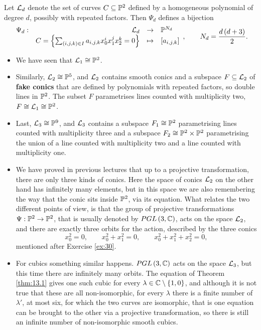 \begin{definition}
Let $ \LL_d $ denote the set of curves $ C \subseteq \P^2 $ defined by a homogeneous polynomial of degree $ d $, possibly with repeated factors. Then $ \Psi_d $ defines a bijection
$$ \function[\Psi_d]{\LL_d}{\P^{N_d}}{C = \cb{\sum_{\rb{i, j, k} \in I} a_{i, j, k}x_0^ix_1^jx_2^k = 0}}{\sb{a_{i, j, k}}}, \qquad N_d = \dfrac{d\rb{d + 3}}{2}. $$
\end{definition}

\begin{example}
\hfill
\begin{itemize}
\item We have seen that $ \LL_1 \cong \P^2 $.
\item Similarly, $ \LL_2 \cong \P^5 $, and $ \LL_2 $ contains smooth conics and a subspace $ F \subseteq \LL_2 $ of \textbf{fake conics} that are defined by polynomials with repeated factors, so double lines in $ \P^2 $. The subset $ F $ parametrises lines counted with multiplicity two, $ F \cong \LL_1 \cong \P^2 $.
\item Last, $ \LL_3 \cong \P^9 $, and $ \LL_3 $ contains a subspace $ F_1 \cong \P^2 $ parametrising lines counted with multiplicity three and a subspace $ F_2 \cong \P^2 \times \P^2 $ parametrising the union of a line counted with multiplicity two and a line counted with multiplicity one.
\end{itemize}
\end{example}

\pagebreak

\begin{remark}
\hfill
\begin{itemize}
\item We have proved in previous lectures that up to a projective transformation, there are only three kinds of conics. Here the space of conics $ \LL_2 $ on the other hand has infinitely many elements, but in this space we are also remembering the way that the conic sits inside $ \P^2 $, via its equation. What relates the two different points of view, is that the group of projective transformations $ \Psi : \P^2 \to \P^2 $, that is usually denoted by $ PGL\rb{3, \C} $, acts on the space $ \LL_2 $, and there are exactly three orbits for the action, described by the three conics
$$ x_0^2 = 0, \qquad x_0^2 + x_1^2 = 0, \qquad x_0^2 + x_1^2 + x_2^2 = 0, $$
mentioned after Exercise \ref{ex:30}.
\item For cubics something similar happens. $ PGL\rb{3, \C} $ acts on the space $ \LL_3 $, but this time there are infinitely many orbits. The equation of Theorem \ref{thm:13.1} gives one such cubic for every $ \lambda \in \C \setminus \cb{1, 0} $, and although it is not true that these are all non-isomorphic, for every $ \lambda $ there is a finite number of $ \lambda' $, at most six, for which the two curves are isomorphic, that is one equation can be brought to the other via a projective transformation, so there is still an infinite number of non-isomorphic smooth cubics.
\end{itemize}
\end{remark}


